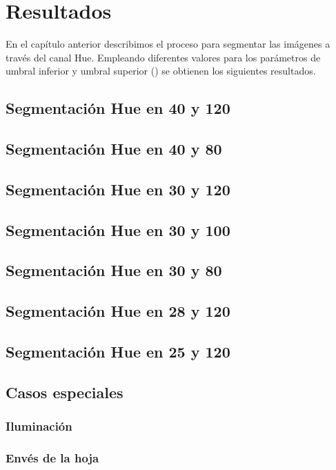 \chapter{Resultados}
En el capítulo anterior describimos el proceso para segmentar las imágenes a través del canal Hue. Empleando diferentes valores para los parámetros de umbral inferior y umbral superior () se obtienen los siguientes resultados.

\section{Segmentación Hue en 40 y 120}


\section{Segmentación Hue en 40 y 80}


\section{Segmentación Hue en 30 y 120}


\section{Segmentación Hue en 30 y 100}


\section{Segmentación Hue en 30 y 80}


\section{Segmentación Hue en 28 y 120}


\section{Segmentación Hue en 25 y 120}


\section{Casos especiales}

\subsection{Iluminación}

\subsection{Envés de la hoja}